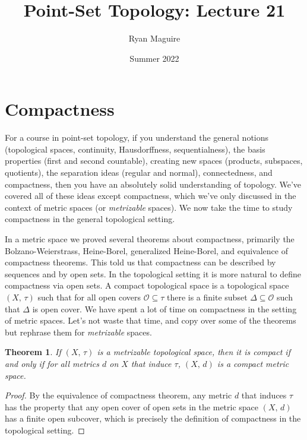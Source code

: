 \documentclass{article}
\title{Point-Set Topology: Lecture 21}
\author{Ryan Maguire}
\date{Summer 2022}
\theoremstyle{plain}
\newtheorem{theorem}{Theorem}[section]
\theoremstyle{normal}
\newenvironment{definition}{%
    \pushQED{\qed}\renewcommand{\qedsymbol}{$\blacksquare$}\definitionx%
}{%
    \popQED\enddefinitionx%
}
\begin{document}
    \maketitle
    \section{Compactness}
        For a course in point-set topology, if you understand the general
        notions (topological spaces, continuity, Hausdorffness, sequentialness),
        the basis properties (first and second countable), creating new spaces
        (products, subspaces, quotients), the separation ideas
        (regular and normal), connectedness, and compactness, then you have an
        absolutely solid understanding of topology. We've covered all of these
        ideas except compactness, which we've only discussed in the context of
        metric spaces (or \textit{metrizable} spaces). We now take the time to
        study compactness in the general topological setting.
        \par\hfill\par
        In a metric space we proved several theorems about compactness,
        primarily the Bolzano-Weierstrass, Heine-Borel, generalized
        Heine-Borel, and equivalence of compactness theorems. This told us
        that compactness can be described by sequences and by open sets. In the
        topological setting it is more natural to define compactness via open
        sets.
        \begin{definition}[\textbf{Compact Topological Space}]
            A compact topological space is a topological space $(X,\,\tau)$
            such that for all open covers $\mathcal{O}\subseteq\tau$ there is
            a finite subset $\Delta\subseteq\mathcal{O}$ such that $\Delta$ is
            open cover.
        \end{definition}
        We have spent a lot of time on compactness in the setting of metric
        spaces. Let's not waste that time, and copy over some of the theorems
        but rephrase them for \textit{metrizable} spaces.
        \begin{theorem}
            If $(X,\,\tau)$ is a metrizable topological space, then it is
            compact if and only if for all metrics $d$ on $X$ that induce
            $\tau$, $(X,\,d)$ is a compact metric space.
        \end{theorem}
        \begin{proof}
            By the equivalence of compactness theorem, any metric $d$ that
            induces $\tau$ has the property that any open cover of open sets
            in the metric space $(X,\,d)$ has a finite open subcover, which is
            precisely the definition of compactness in the topological setting.
        \end{proof}
\end{document}
